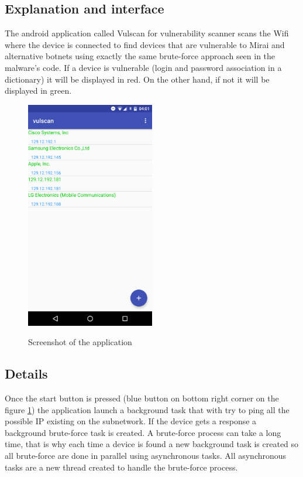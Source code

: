 \documentclass{report}
\begin{document}
\subsection{Explanation and interface}
The android application called Vulscan for vulnerability scanner scans the Wifi where the device is connected to find devices that are vulnerable to Mirai and alternative botnets using exactly the same brute-force approach seen in the malware's code. If a device is vulnerable (login and password association in a dictionary) it will be displayed in red. On the other hand, if not it will be displayed in green.
\begin{figure}[h]
 \caption{Screenshot of the application}
 \centering
 \includegraphics[width=0.5\textwidth]{./img/screen-act}
 \label{fig:screen-act}
\end{figure}

\subsection{Details}
Once the start button is pressed (blue button on bottom right corner on the figure \ref{fig:screen-act}) the application launch a background task that with try to ping all the possible IP existing on the subnetwork. If the device gets a response a background brute-force task is created. A brute-force process can take a long time, that is why each time a device is found a new background task is created so all brute-force are done in parallel using asynchronous tasks. All asynchronous tasks are a new thread created to handle the brute-force process.
\end{document}
